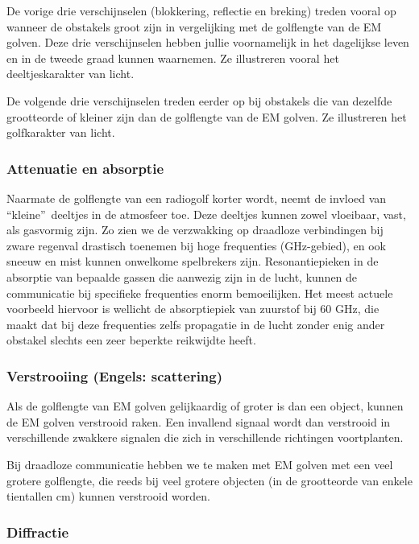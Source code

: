 De vorige drie verschijnselen (blokkering, reflectie en breking) treden vooral op wanneer de obstakels groot zijn in vergelijking met de golflengte van de EM golven. Deze drie verschijnselen hebben jullie voornamelijk in het dagelijkse leven en in de tweede graad kunnen waarnemen. Ze illustreren vooral het deeltjeskarakter van licht.

De volgende drie verschijnselen treden eerder op bij obstakels die van dezelfde grootteorde of kleiner zijn dan de golflengte van de EM golven. Ze illustreren het golfkarakter van licht.

\subsubsection{Attenuatie en absorptie}

Naarmate de golflengte van een radiogolf korter wordt, neemt de invloed van \textquotedblleft kleine\textquotedblright \ deeltjes in de atmosfeer toe. Deze deeltjes kunnen zowel vloeibaar, vast, als gasvormig zijn. Zo zien we de verzwakking op draadloze verbindingen bij zware regenval drastisch toenemen bij hoge frequenties (GHz-gebied), en ook sneeuw en mist kunnen onwelkome spelbrekers zijn. Resonantiepieken in de absorptie van bepaalde gassen die aanwezig zijn in de lucht, kunnen de communicatie bij specifieke frequenties enorm bemoeilijken. Het meest actuele voorbeeld hiervoor is wellicht de absorptiepiek van zuurstof bij 60 GHz, die maakt dat bij deze frequenties zelfs propagatie in de lucht zonder enig ander obstakel slechts een zeer beperkte reikwijdte heeft.

\subsubsection{Verstrooiing (Engels: scattering)}

Als de golflengte van EM golven gelijkaardig of groter is dan een object, kunnen de EM golven verstrooid raken. Een invallend signaal wordt dan verstrooid in verschillende zwakkere signalen die zich in verschillende richtingen voortplanten. 


Bij draadloze communicatie hebben we te maken met EM golven met een veel grotere golflengte, die reeds bij veel grotere objecten (in de grootteorde van enkele tientallen cm) kunnen verstrooid worden.

\subsubsection{Diffractie}

